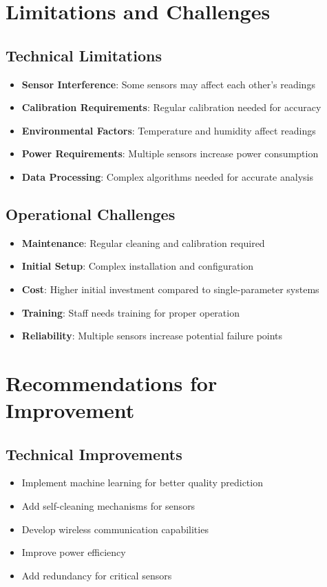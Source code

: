 \documentclass[12pt,a4paper]{article}
\begin{document}
\section{Limitations and Challenges}

\subsection{Technical Limitations}
\begin{itemize}
    \item \textbf{Sensor Interference}: Some sensors may affect each other's readings
    \item \textbf{Calibration Requirements}: Regular calibration needed for accuracy
    \item \textbf{Environmental Factors}: Temperature and humidity affect readings
    \item \textbf{Power Requirements}: Multiple sensors increase power consumption
    \item \textbf{Data Processing}: Complex algorithms needed for accurate analysis
\end{itemize}

\subsection{Operational Challenges}
\begin{itemize}
    \item \textbf{Maintenance}: Regular cleaning and calibration required
    \item \textbf{Initial Setup}: Complex installation and configuration
    \item \textbf{Cost}: Higher initial investment compared to single-parameter systems
    \item \textbf{Training}: Staff needs training for proper operation
    \item \textbf{Reliability}: Multiple sensors increase potential failure points
\end{itemize}

\section{Recommendations for Improvement}

\subsection{Technical Improvements}
\begin{itemize}
    \item Implement machine learning for better quality prediction
    \item Add self-cleaning mechanisms for sensors
    \item Develop wireless communication capabilities
    \item Improve power efficiency
    \item Add redundancy for critical sensors
\end{itemize}
\end{document}

